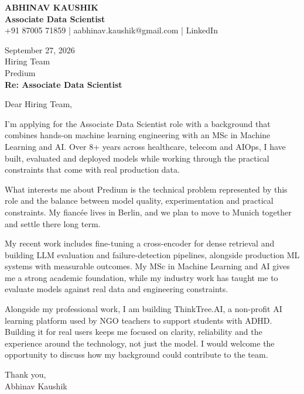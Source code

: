 \documentclass[10pt,a4paper]{article}
\begin{document}
\begin{center}
{\Large\bfseries ABHINAV KAUSHIK}\\[2pt]
{\bfseries Associate Data Scientist}\\[2pt]
+91 87005 71859 \quad | \quad aabhinav.kaushik@gmail.com \quad | \quad LinkedIn
\end{center}
\vspace{8pt}
September 27, 2026\\[6pt]
Hiring Team\\
Predium\\[4pt]
\textbf{Re: Associate Data Scientist}

Dear Hiring Team,

I’m applying for the Associate Data Scientist role with a background that combines hands-on machine learning engineering with an MSc in Machine Learning and AI. Over 8+ years across healthcare, telecom and AIOps, I have built, evaluated and deployed models while working through the practical constraints that come with real production data.

What interests me about Predium is the technical problem represented by this role and the balance between model quality, experimentation and practical constraints. My fiancée lives in Berlin, and we plan to move to Munich together and settle there long term.

My recent work includes fine-tuning a cross-encoder for dense retrieval and building LLM evaluation and failure-detection pipelines, alongside production ML systems with measurable outcomes. My MSc in Machine Learning and AI gives me a strong academic foundation, while my industry work has taught me to evaluate models against real data and engineering constraints.

Alongside my professional work, I am building ThinkTree.AI, a non-profit AI learning platform used by NGO teachers to support students with ADHD. Building it for real users keeps me focused on clarity, reliability and the experience around the technology, not just the model. I would welcome the opportunity to discuss how my background could contribute to the team.

Thank you,\\
Abhinav Kaushik
\end{document}
